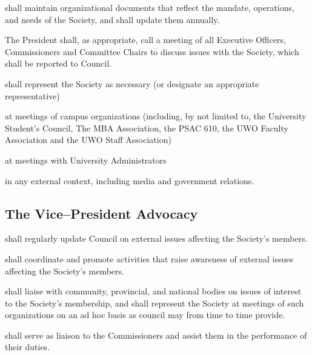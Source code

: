 \begin{longenum}[ label*=\thesubsection.\arabic*., align=left]
    \item shall maintain organizational documents that reflect the mandate, operations, and needs of the Society, and shall update them annually. 
    \item The President shall, as appropriate, call a meeting of all Executive Officers, Commissioners and Committee Chairs to discuss issues with the Society, which shall be reported to Council.
        \item shall represent the Society as necessary (or designate an appropriate representative)
        \begin{longenum}[ label*=\arabic*., align=left]
        \item at meetings of campus organizations (including, by not limited to, the University Student's Council, The MBA Association, the PSAC 610, the UWO Faculty Association and the UWO Staff Association)
        \item at meetings with University Administrators
        \item in any external context, including media and government relations.
        \end{longenum}        
            
\end{longenum}

\subsection {The Vice--President Advocacy}
\begin{longenum}[ label*=\thesubsection.\arabic*., align=left]
	\item shall regularly update Council on external issues affecting the Society's members.
    \item shall coordinate and promote activities that raise awareness of external issues affecting the Society's members.
    \item shall liaise with community, provincial, and national bodies on issues of interest to the Society's membership, and shall represent the Society at meetings of such organizations on an ad hoc basis as council may from time to time provide.
\item shall serve as liaison to the Commissioners and assist them in the performance of their duties.  

\end{longenum}


